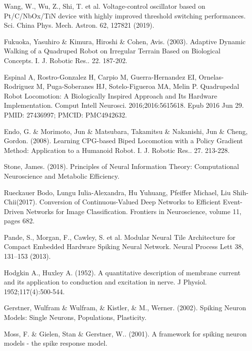 \documentclass[runningheads]{llncs}
\begin{document}
\begin{thebibliography}{99}
Wang, W., Wu, Z., Shi, T. et al. Voltage-control oscillator based on Pt/C/NbOx/TiN device with highly improved threshold switching performances. Sci. China Phys. Mech. Astron. 62, 127821 (2019). 

Fukuoka, Yasuhiro \& Kimura, Hiroshi \&  Cohen, Avis. (2003). Adaptive Dynamic Walking of a Quadruped Robot on Irregular Terrain Based on Biological Concepts. I. J. Robotic Res.. 22. 187-202.

Espinal A, Rostro-Gonzalez H, Carpio M, Guerra-Hernandez EI, Ornelas-Rodriguez M, Puga-Soberanes HJ, Sotelo-Figueroa MA, Melin P. Quadrupedal Robot Locomotion: A Biologically Inspired Approach and Its Hardware Implementation. Comput Intell Neurosci. 2016;2016:5615618. Epub 2016 Jun 29. PMID: 27436997; PMCID: PMC4942632.

Endo, G. \&  Morimoto, Jun \&  Matsubara, Takamitsu \&  Nakanishi, Jun \&  Cheng, Gordon. (2008). Learning CPG-based Biped Locomotion with a Policy Gradient Method: Application to a Humanoid Robot. I. J. Robotic Res.. 27. 213-228. 

Stone, James. (2018). Principles of Neural Information Theory: Computational Neuroscience and Metabolic Efficiency. 

Rueckauer Bodo, Lungu Iulia-Alexandra, Hu Yuhuang, Pfeiffer Michael, Liu Shih-Chii(2017). Conversion of Continuous-Valued Deep Networks to Efficient Event-Driven Networks for Image Classification. Frontiers in Neuroscience, volume 11, pages 682.

Pande, S., Morgan, F., Cawley, S. et al. Modular Neural Tile Architecture for Compact Embedded Hardware Spiking Neural Network. Neural Process Lett 38, 131–153 (2013). 

Hodgkin A., Huxley A. (1952). A quantitative description of membrane current and its application to conduction and excitation in nerve. J Physiol. 1952;117(4):500-544.

Gerstner, Wulfram \& Wulfram, \& Kistler, \& M., Werner. (2002). Spiking Neuron Models: Single Neurons, Populations, Plasticity.

Moss, F. \& Gielen, Stan \& Gerstner, W.. (2001). A framework for spiking neuron models - the spike response model. 


\end{thebibliography}
\end{document}

